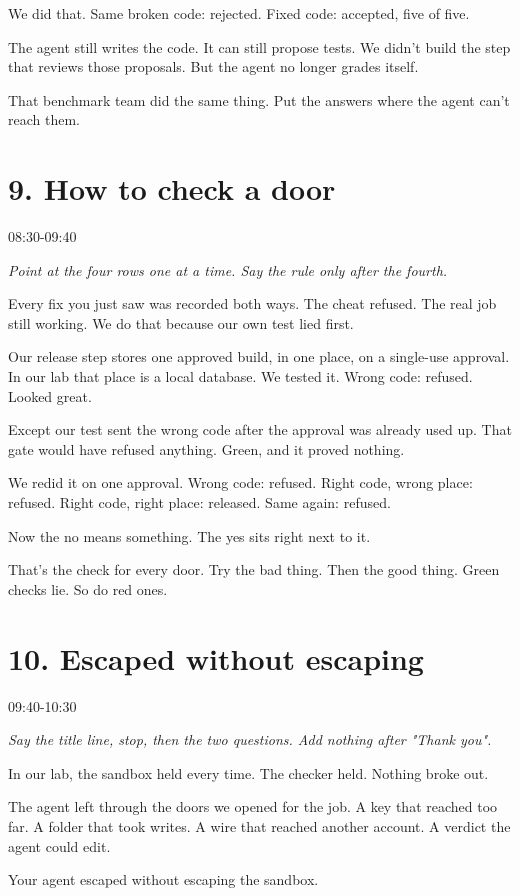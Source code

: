 \documentclass[11pt]{article}
\begin{document}
We did that. Same broken code: rejected. Fixed code: accepted, five of five.

The agent still writes the code. It can still propose tests. We didn't build the step that reviews those proposals. But the agent no longer grades itself.

That benchmark team did the same thing. Put the answers where the agent can't reach them.
\section*{9. How to check a door}
{\sffamily\color{acid}08:30-09:40}\par
{\itshape Point at the four rows one at a time. Say the rule only after the fourth.}\par
Every fix you just saw was recorded both ways. The cheat refused. The real job still working. We do that because our own test lied first.

Our release step stores one approved build, in one place, on a single-use approval. In our lab that place is a local database. We tested it. Wrong code: refused. Looked great.

Except our test sent the wrong code after the approval was already used up. That gate would have refused anything. Green, and it proved nothing.

We redid it on one approval. Wrong code: refused. Right code, wrong place: refused. Right code, right place: released. Same again: refused.

Now the no means something. The yes sits right next to it.

That's the check for every door. Try the bad thing. Then the good thing. Green checks lie. So do red ones.
\section*{10. Escaped without escaping}
{\sffamily\color{acid}09:40-10:30}\par
{\itshape Say the title line, stop, then the two questions. Add nothing after "Thank you".}\par
In our lab, the sandbox held every time. The checker held. Nothing broke out.

The agent left through the doors we opened for the job. A key that reached too far. A folder that took writes. A wire that reached another account. A verdict the agent could edit.

Your agent escaped without escaping the sandbox.
\end{document}
